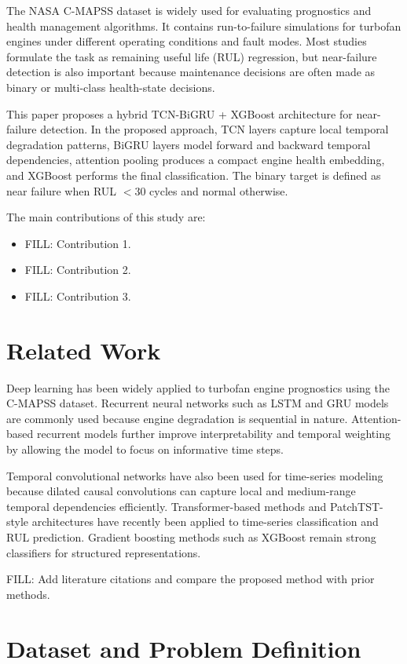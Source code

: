 \documentclass[conference]{IEEEtran}
\begin{document}
The NASA C-MAPSS dataset is widely used for evaluating prognostics and health management algorithms. It contains run-to-failure simulations for turbofan engines under different operating conditions and fault modes. Most studies formulate the task as remaining useful life (RUL) regression, but near-failure detection is also important because maintenance decisions are often made as binary or multi-class health-state decisions.

This paper proposes a hybrid TCN-BiGRU + XGBoost architecture for near-failure detection. In the proposed approach, TCN layers capture local temporal degradation patterns, BiGRU layers model forward and backward temporal dependencies, attention pooling produces a compact engine health embedding, and XGBoost performs the final classification. The binary target is defined as near failure when RUL $< 30$ cycles and normal otherwise.

The main contributions of this study are:
\begin{itemize}
    \item FILL: Contribution 1.
    \item FILL: Contribution 2.
    \item FILL: Contribution 3.
\end{itemize}

\section{Related Work}

Deep learning has been widely applied to turbofan engine prognostics using the C-MAPSS dataset. Recurrent neural networks such as LSTM and GRU models are commonly used because engine degradation is sequential in nature. Attention-based recurrent models further improve interpretability and temporal weighting by allowing the model to focus on informative time steps.

Temporal convolutional networks have also been used for time-series modeling because dilated causal convolutions can capture local and medium-range temporal dependencies efficiently. Transformer-based methods and PatchTST-style architectures have recently been applied to time-series classification and RUL prediction. Gradient boosting methods such as XGBoost remain strong classifiers for structured representations.

FILL: Add literature citations and compare the proposed method with prior methods.

\section{Dataset and Problem Definition}
\end{document}
